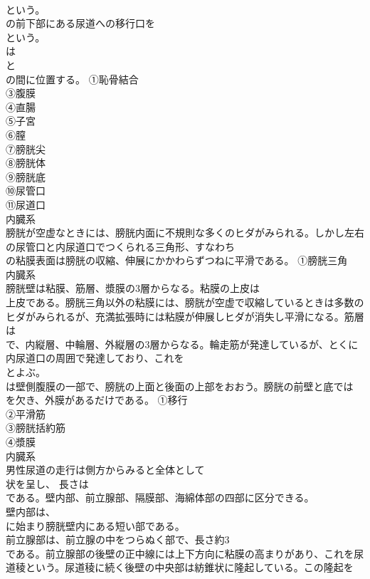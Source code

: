 \documentclass[8pt]{extreport}
\begin{document}
\begin{CJK}{UTF8}{min}
\\	という。
\\	の前下部にある尿道への移行口を
\\	という。
\\	は
\\	と
\\	の間に位置する。	①恥骨結合
\\	③腹膜
\\	④直腸
\\	⑤子宮
\\	⑥膣
\\	⑦膀胱尖
\\	⑧膀胱体
\\	⑨膀胱底
\\	⑩尿管口
\\	⑪尿道口
\\	内臓系
\\	膀胱が空虚なときには、膀胱内面に不規則な多くのヒダがみられる。しかし左右の尿管口と内尿道口でつくられる三角形、すなわち
\\	の粘膜表面は膀胱の収縮、伸展にかかわらずつねに平滑である。	①膀胱三角
\\	内臓系
\\	膀胱壁は粘膜、筋層、漿膜の3層からなる。粘膜の上皮は
\\	上皮である。膀胱三角以外の粘膜には、膀胱が空虚で収縮しているときは多数のヒダがみられるが、充満拡張時には粘膜が伸展しヒダが消失し平滑になる。筋層は
\\	で、内縦層、中輪層、外縦層の3層からなる。輪走筋が発達しているが、とくに内尿道口の周囲で発達しており、これを
\\	とよぶ。
\\	は壁側腹膜の一部で、膀胱の上面と後面の上部をおおう。膀胱の前壁と底では
\\	を欠き、外膜があるだけである。	①移行
\\	②平滑筋
\\	③膀胱括約筋
\\	④漿膜
\\	内臓系
\\	男性尿道の走行は側方からみると全体として
\\	状を呈し、 長さは
\\	である。壁内部、前立腺部、隔膜部、海綿体部の四部に区分できる。
\\	壁内部は、
\\	に始まり膀胱壁内にある短い部である。
\\	前立腺部は、前立腺の中をつらぬく部で、長さ約3
\\	である。前立腺部の後壁の正中線には上下方向に粘膜の高まりがあり、これを尿道稜という。尿道稜に続く後壁の中央部は紡錐状に隆起している。この隆起を

\end{CJK}
\end{document}
